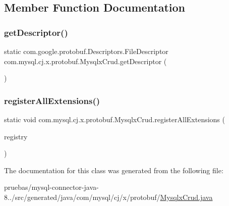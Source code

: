\subsection{Member Function Documentation}
\mbox{\label{classcom_1_1mysql_1_1cj_1_1x_1_1protobuf_1_1_mysqlx_crud_a3ae25aea11ecd8e5cf721fd281021f10}} 
\subsubsection{\texorpdfstring{get\+Descriptor()}{getDescriptor()}}
{\footnotesize\ttfamily static com.\+google.\+protobuf.\+Descriptors.\+File\+Descriptor com.\+mysql.\+cj.\+x.\+protobuf.\+Mysqlx\+Crud.\+get\+Descriptor (\begin{DoxyParamCaption}{ }\end{DoxyParamCaption})\hspace{0.3cm}{\ttfamily [static]}}

\mbox{\label{classcom_1_1mysql_1_1cj_1_1x_1_1protobuf_1_1_mysqlx_crud_a2927ce119a78def2e1356307be256996}} 
\subsubsection{\texorpdfstring{register\+All\+Extensions()}{registerAllExtensions()}}
{\footnotesize\ttfamily static void com.\+mysql.\+cj.\+x.\+protobuf.\+Mysqlx\+Crud.\+register\+All\+Extensions (\begin{DoxyParamCaption}\item[{com.\+google.\+protobuf.\+Extension\+Registry}]{registry }\end{DoxyParamCaption})\hspace{0.3cm}{\ttfamily [static]}}



The documentation for this class was generated from the following file\+:\begin{DoxyCompactItemize}
\item 
pruebas/mysql-\/connector-\/java-\/8../src/generated/java/com/mysql/cj/x/protobuf/\mbox{\hyperlink{_mysqlx_crud_8java}{Mysqlx\+Crud.\+java}}\end{DoxyCompactItemize}
